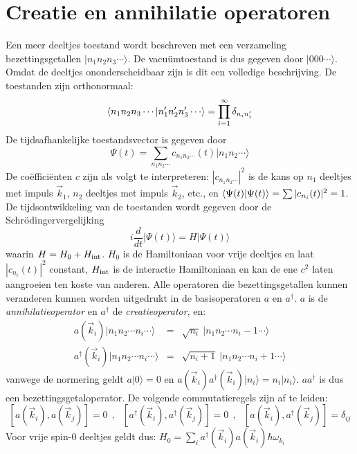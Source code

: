 \section[~~Creatie en annihilatie operatoren]{Creatie en annihilatie operatoren}
Een meer deeltjes toestand wordt beschreven met een verzameling
bezettingsgetallen $|n_1n_2n_3\cdots\rangle$. De vacu\"umtoestand is dus
gegeven door $|000\cdots\rangle$. Omdat de deeltjes ononderscheidbaar zijn is
dit een volledige beschrijving. De toestanden zijn orthonormaal:
\[
\av{n_1n_2n_3\cdots|n_1'n_2'n_3'\cdots}=\prod_{i=1}^\infty\delta_{n_in_i'}
\]
De tijdsafhankelijke toestandsvector is gegeven door
\[
\Psi(t)=\sum_{n_1n_2\cdots}c_{n_1n_2\cdots}(t)|n_1n_2\cdots\rangle
\]
De co\"effici\"enten $c$ zijn als volgt te interpreteren:
$|c_{n_1n_2\cdots}|^2$ is de kans op $n_1$ deeltjes met impuls $\vec{k}_1$,
$n_2$ deeltjes met impuls $\vec{k}_2$, etc., en
$\left\langle \Psi(t)|\Psi(t) \right\rangle=\sum|c_{n_i}(t)|^2=1$. De tijdsontwikkeling van de
toestanden wordt gegeven door de Schr\"odingervergelijking
\[
i\frac{d}{dt}|\Psi(t)\rangle=H|\Psi(t)\rangle
\]
waarin $H=H_0+H_{\rm int}$. $H_0$ is de Hamiltoniaan voor vrije deeltjes en
laat $|c_{n_i}(t)|^2$ constant, $H_{\rm int}$ is de interactie Hamiltoniaan en
kan de ene $c^2$ laten aangroeien ten koste van anderen.
\npar
Alle operatoren die bezettingsgetallen kunnen veranderen kunnen worden
uitgedrukt in de basisoperatoren $a$ en $a^\dagger$. $a$ is de
{\it annihilatieoperator} en $a^\dagger$ de {\it creatieoperator}, en:
\begin{eqnarray*}
a(\vec{k}_i)|n_1n_2\cdots n_i\cdots\rangle&=&\sqrt{n_i}~|n_1n_2\cdots n_i-1\cdots\rangle\\
a^\dagger(\vec{k}_i)|n_1n_2\cdots n_i\cdots\rangle&=&\sqrt{n_i+1}~|n_1n_2\cdots n_i+1\cdots\rangle
\end{eqnarray*}
vanwege de normering geldt $a|0\rangle=0$ en
$a(\vec{k}_i)a^\dagger(\vec{k}_i)|n_i\rangle=n_i|n_i\rangle$. $aa^\dagger$ is
dus een bezettingsgetaloperator. De volgende commutatieregels zijn af te
leiden:
\[
[a(\vec{k}_i),a(\vec{k}_j)]=0~~,~~~
[a^\dagger(\vec{k}_i),a^\dagger(\vec{k}_j)]=0~~,~~~
[a(\vec{k}_i),a^\dagger(\vec{k}_j)]=\delta_{ij}
\]
Voor vrije spin-0 deeltjes geldt dus:
$H_0=\sum\limits_i a^\dagger(\vec{k}_i)a(\vec{k}_i)\hbar\omega_{k_i}$

